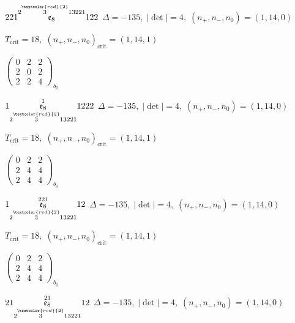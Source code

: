 \documentclass[10pt]{article}
\begin{document}
$221\overset{2\overset{\textcolor{red}{2}}{3}13221}{\mathfrak{e}_8}122$ \quad $\Delta=-135,\; |\det|=4,\; (n_+,n_-,n_0)=(1,14,0)$

\hspace{1em}$T_{\text{crit}}=18,\; (n_+,n_-,n_0)_{\text{crit}}=(1,14,1)$

\hspace{2em}$\left(\begin{smallmatrix}0 & 2 & 2 \\ 2 & 0 & 2 \\ 2 & 2 & 4\end{smallmatrix}\right)_{\!b_0}$

\smallskip

$1\overset{1}{\underset{2\overset{\textcolor{red}{2}}{3}13221}{\mathfrak{e}_8}}1222$ \quad $\Delta=-135,\; |\det|=4,\; (n_+,n_-,n_0)=(1,14,0)$

\hspace{1em}$T_{\text{crit}}=18,\; (n_+,n_-,n_0)_{\text{crit}}=(1,14,1)$

\hspace{2em}$\left(\begin{smallmatrix}0 & 2 & 2 \\ 2 & 4 & 4 \\ 2 & 4 & 4\end{smallmatrix}\right)_{\!b_0}$

\smallskip

$1\overset{221}{\underset{2\overset{\textcolor{red}{2}}{3}13221}{\mathfrak{e}_8}}12$ \quad $\Delta=-135,\; |\det|=4,\; (n_+,n_-,n_0)=(1,14,0)$

\hspace{1em}$T_{\text{crit}}=18,\; (n_+,n_-,n_0)_{\text{crit}}=(1,14,1)$

\hspace{2em}$\left(\begin{smallmatrix}0 & 2 & 2 \\ 2 & 4 & 4 \\ 2 & 4 & 4\end{smallmatrix}\right)_{\!b_0}$

\smallskip

$21\overset{21}{\underset{2\overset{\textcolor{red}{2}}{3}13221}{\mathfrak{e}_8}}12$ \quad $\Delta=-135,\; |\det|=4,\; (n_+,n_-,n_0)=(1,14,0)$
\end{document}

